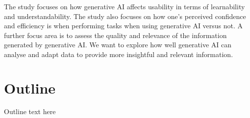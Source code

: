 The study focuses on how generative AI affects usability in terms of learnability and understandability. The study also focuses on how one's perceived confidence and efficiency is when performing tasks when using generative AI versus not. A further focus area is to assess the quality and relevance of the information generated by generative AI. We want to explore how well generative AI can analyse and adapt data to provide more insightful and relevant information.

\begin{comment}
Through this research, we hope to contribute insights into how generative AI can be used to improve user experience in data-intensive applications, and how these techniques can be adapted to meet the needs of a broad user base.

Our study aims to put generative AI in a broader social context, to understand its potential and limitations in terms of user experience in data-intensive web applications.
\end{comment}

\section{Outline}
Outline text here
\begin{comment}
    Kort förklaring om hur dokumentet är strukturerat och vad varje kapitel kommer  handla om, ifall jag fattat det rätt.
\end{comment}